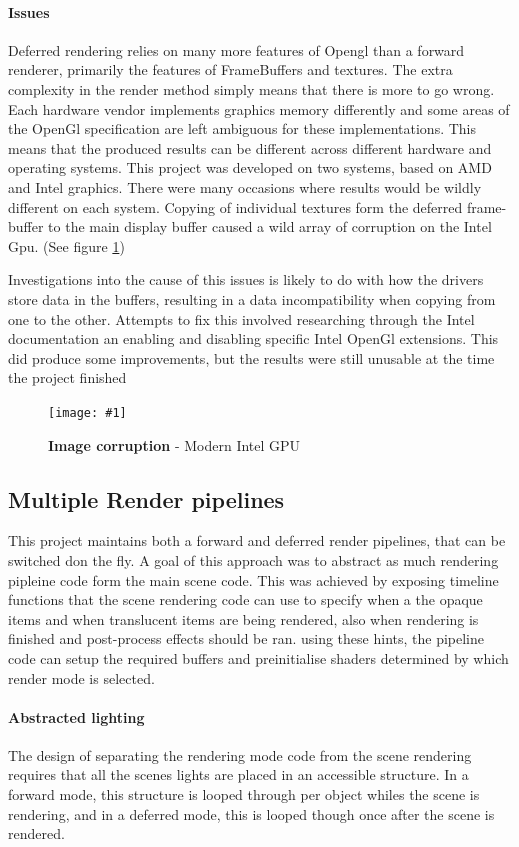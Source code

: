 \documentclass[conference]{acmsiggraph}
\newcommand{\figuremacroF}[4]{
	\begin{figure}[h] %
		\centering
		\texttt{[image: \#1]}
		\caption[#2]{\textbf{#2} - #3}
		\label{fig:#1}
	\end{figure}
}
\begin{document}
\paragraph{Issues}
Deferred rendering relies on many more features of Opengl than a forward renderer, primarily the features of FrameBuffers and textures. The extra complexity in the render method simply means that there is more to go wrong. Each hardware vendor implements graphics memory differently and some areas of the OpenGl specification are left ambiguous for these implementations. This means that the produced results can be different across different hardware and operating systems. This project was developed on two systems, based on AMD and Intel graphics. There were many occasions where results would be wildly different on each system. Copying of individual textures form the deferred frame-buffer to the main display buffer caused a wild array of corruption on the Intel Gpu. 
(See figure \ref{fig:intel})

Investigations into the cause of this issues is likely to do with how the drivers store data in the buffers, resulting in a data incompatibility when copying from one to the other. Attempts to fix this involved researching through the Intel documentation an enabling and disabling specific Intel OpenGl extensions. This did produce some improvements, but the results were still unusable at the time the project finished 
 
\figuremacroF
{intel}
{Image corruption}
{Modern Intel GPU}
{1.0}

\subsection{Multiple Render pipelines}
This project maintains both a forward and deferred render pipelines, that can be switched don the fly. A goal of this approach was to abstract as much rendering pipleine code form the main scene code. This was achieved by exposing timeline functions that the scene rendering code can use to specify when a the opaque items and when translucent items are being rendered, also when rendering is finished and post-process effects should be ran. using these hints, the pipeline code can setup the required buffers and preinitialise shaders determined by which render mode is selected.

\paragraph{Abstracted lighting}
The design of separating the rendering mode code from the scene rendering requires that all the scenes lights are placed in an accessible structure. In a forward mode, this structure is looped through per object whiles the scene is rendering, and in a deferred mode, this is looped though once after the scene is rendered.
\end{document}
